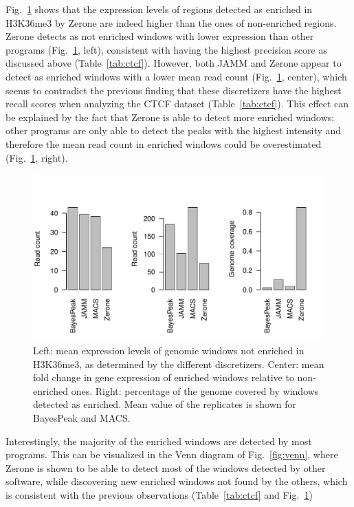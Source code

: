 \documentclass{bioinfo}
\begin{document}
Fig.~\ref{fig:expr} shows that the expression levels of regions detected as
enriched in H3K36me3 by Zerone are indeed higher than the ones of non-enriched
regions. Zerone detects as not enriched windows with lower expression than other
programs (Fig.~\ref{fig:expr}, left), consistent with having the highest
precision score as discussed above (Table~\ref{tab:ctcf}). However, both JAMM
and Zerone appear to detect as enriched windows with a lower mean read count
(Fig.~\ref{fig:expr}, center), which seems to contradict the previous finding
that these discretizers have the highest recall scores when analyzing the CTCF
dataset (Table~\ref{tab:ctcf}). This effect can be explained by the fact that
Zerone is able to detect more enriched windows: other programs are only able to
detect the peaks with the highest intensity and therefore the mean read count in
enriched windows could be overestimated (Fig.~\ref{fig:expr}, right).

\begin{figure}[!tpb]
\centerline{\includegraphics[scale=0.5]{histone_expr.pdf}}
\caption{Left: mean expression levels of genomic windows not enriched in
H3K36me3, as determined by the different discretizers. Center: mean fold change
in gene expression of enriched windows relative to non-enriched ones. Right:
percentage of the genome covered by windows detected as enriched. Mean value
of the replicates is shown for BayesPeak and MACS.}
\label{fig:expr}
\end{figure}

Interestingly, the majority of the enriched windows are detected by most
programs. This can be visualized in the Venn diagram of Fig.~\ref{fig:venn},
where Zerone is shown to be able to detect most of the windows detected by other
software, while discovering new enriched windows not found by the others, which
is consistent with the previous observations (Table~\ref{tab:ctcf} and
Fig.~\ref{fig:expr})
\end{document}
